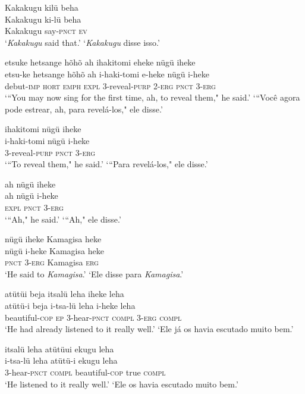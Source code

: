 \documentclass[output=paper,
modfonts,nonflat
]{langsci/langscibook}
\begin{document}
\ea  Kakakugu kilü beha\\[.3em]
\gll Kakakugu ki-lü beha\\
     Kakakugu say-\textsc{pnct} \textsc{ev}\\
\glt ‘\textit{Kakakugu} said that.’
\glt ‘\textit{Kakakugu} disse isso.’
\z

\ea  etsuke hetsange hõhõ ah ihakitomi eheke nügü iheke\\[.3em]
\gll etsu-ke hetsange hõhõ ah i-haki-tomi e-heke nügü i-heke\\
     debut-\textsc{imp} \textsc{hort} \textsc{emph} \textsc{expl} 3-reveal-\textsc{purp} 2-\textsc{erg} \textsc{pnct} 3-\textsc{erg}\\
\glt ‘“You may now sing for the first time, ah, to reveal them," he said.’
\glt ‘“Você agora pode estrear, ah, para revelá-los," ele disse.’
\z

\ea  ihakitomi nügü iheke\\[.3em]
\gll i-haki-tomi nügü i-heke\\
     3-reveal-\textsc{purp} \textsc{pnct} 3-\textsc{erg}\\
\glt ‘“To reveal them," he said.’
\glt ‘“Para revelá-los," ele disse.’
\z

\ea  ah nügü iheke\\[.3em]
\gll ah nügü i-heke\\
     \textsc{expl} \textsc{pnct} 3-\textsc{erg}\\
\glt ‘“Ah," he said.’
\glt ‘“Ah," ele disse.’
\z

\ea  nügü iheke Kamagisa heke\\[.3em]
\gll nügü i-heke Kamagisa heke\\
     \textsc{pnct} 3-\textsc{erg} Kamagisa \textsc{erg}\\
\glt ‘He said to \textit{Kamagisa}.’
\glt ‘Ele disse para \textit{Kamagisa}.’
\z

\ea  atütüi beja itsalü leha iheke leha\\[.3em]
\gll atütü-i beja i-tsa-lü leha i-heke leha\\
     beautiful-\textsc{cop} \textsc{ep} 3-hear-\textsc{pnct} \textsc{compl} 3-\textsc{erg} \textsc{compl}\\
\glt ‘He had already listened to it really well.’
\glt ‘Ele já os havia escutado muito bem.’
\z

\ea  itsalü leha atütüui ekugu leha\\[.3em]
\gll i-tsa-lü leha atütü-i ekugu leha\\
     3-hear-\textsc{pnct} \textsc{compl} beautiful-\textsc{cop} true \textsc{compl}\\
\glt ‘He listened to it really well.’
\glt ‘Ele os havia escutado muito bem.’
\z
\end{document}

